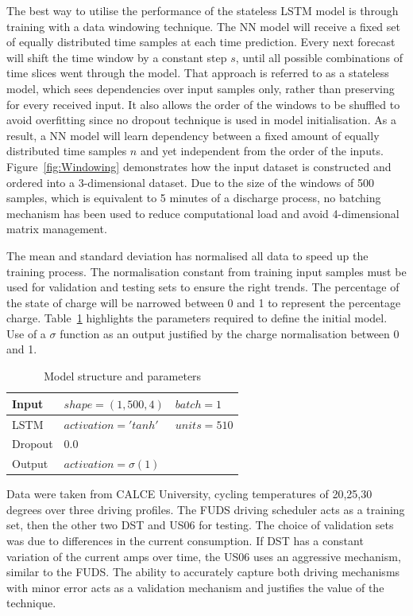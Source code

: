 %
%
The best way to utilise the performance of the stateless LSTM model is through training with a data windowing technique.
The NN model will receive a fixed set of equally distributed time samples at each time prediction.
Every next forecast will shift the time window by a constant step $s$, until all possible combinations of time slices went through the model.
That approach is referred to as a stateless model, which sees dependencies over input samples only, rather than preserving for every received input.
It also allows the order of the windows to be shuffled to avoid overfitting since no dropout technique is used in model initialisation.
As a result, a NN model will learn dependency between a fixed amount of equally distributed time samples $n$ and yet independent from the order of the inputs.
Figure~\ref{fig:Windowing} demonstrates how the input dataset is constructed and ordered into a 3-dimensional dataset.
Due to the size of the windows of 500 samples, which is equivalent to 5 minutes of a discharge process, no batching mechanism has been used to reduce computational load and avoid 4-dimensional matrix management.


%
%
The mean and standard deviation has normalised all data to speed up the training process.
The normalisation constant from training input samples must be used for validation and testing sets to ensure the right trends.
The percentage of the state of charge will be narrowed between 0 and 1 to represent the percentage charge.
Table~\ref{tab:params} highlights the parameters required to define the initial model.
Use of a $\sigma$ function as an output justified by the charge normalisation between 0 and 1.
\begin{table}[ht]
    \centering
    \caption{Model structure and parameters}
    \label{tab:params}
    \begin{tabular}{ p{3.0cm} p{3.5cm} p{2.5cm}   }
        \hline
        Input     & $shape= \left( 1,500,4 \right)$ & $batch=1 $  \\
        \hline
        LSTM      & $activation= 'tanh'$ & $units=510$  \\
        \hline
        Dropout   & $0.0$ &   \\
        \hline
        Output    & $activation= \sigma\left(1\right)$ &   \\
        \hline
    \end{tabular}
\end{table}

%
%
Data were taken from CALCE University, cycling temperatures of 20,25,30 degrees over three driving profiles.
The FUDS driving scheduler acts as a training set, then the other two DST and US06 for testing.
The choice of validation sets was due to differences in the current consumption.
If DST has a constant variation of the current amps over time, the US06 uses an aggressive mechanism, similar to the FUDS.
The ability to accurately capture both driving mechanisms with minor error acts as a validation mechanism and justifies the value of the technique.

